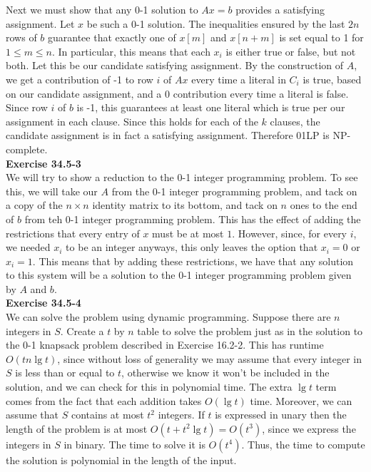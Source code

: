 \documentclass{article}
\begin{document}
Next we must show that any 0-1 solution to $Ax=b$ provides a satisfying assignment.  Let $x$ be such a 0-1 solution.  The inequalities ensured by the last $2n$ rows of $b$ guarantee that exactly one of $x[m]$ and $x[n+m]$ is set equal to 1 for $1 \leq m \leq n$.  In particular, this means that each $x_i$ is either true or false, but not both.  Let this be our candidate satisfying assignment.  By the construction of $A$, we get a contribution of -1 to row $i$ of $Ax$ every time a literal in $C_i$ is true, based on our candidate assignment, and a 0 contribution every time a literal is false. Since row $i$ of $b$ is -1, this guarantees at least one literal which is true per our assignment in each clause.  Since this holds for each of the $k$ clauses, the candidate assignment is in fact a satisfying assignment.  Therefore 01LP is NP-complete. \\

\noindent\textbf{Exercise 34.5-3}\\

We will try to show a reduction to the 0-1 integer programming problem. To see this, we will take our $A$ from the 0-1 integer programming problem, and tack on a copy of the $n\times n$ identity matrix to its bottom, and tack on $n$ ones to the end of $b$ from teh 0-1 integer programming problem. This has the effect of adding the restrictions that every entry of $x$ must be at most $1$. However, since, for every $i$, we needed $x_i$ to be an integer anyways, this only leaves the option that $x_i=0$ or $x_i=1$. This means that by adding these restrictions, we have that any solution to this system will be a solution to the 0-1 integer programming problem given by $A$ and $b$.\\


\noindent\textbf{Exercise 34.5-4}\\

We can solve the problem using dynamic programming.  Suppose there are $n$ integers in $S$.  Create a $t$ by $n$ table to solve the problem just as in the solution to the 0-1 knapsack problem described in Exercise 16.2-2.  This has runtime $O(tn\lg t)$, since without loss of generality we may assume that every integer in $S$ is less than or equal to $t$, otherwise we know it won't be included in the solution, and we can check for this in polynomial time.  The extra $\lg t$ term comes from the fact that each addition takes $O(\lg t)$ time.  Moreover, we can assume that $S$ contains at most $t^2$ integers.  If $t$ is expressed in unary then the length of the problem is at most $O(t+t^2 \lg t) = O(t^3)$, since we express the integers in $S$ in binary.  The time to solve it is $O(t^4)$.  Thus, the time to compute the solution is polynomial in the length of the input. \\
\end{document}
